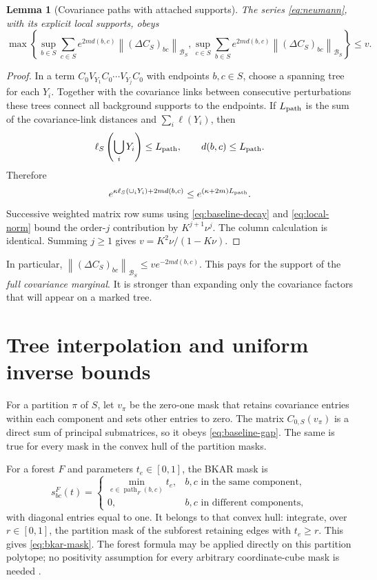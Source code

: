 \documentclass[11pt]{article}
\newtheorem{lemma}{Lemma}
\newcommand{\Bcal}{\mathcal B}
\newcommand{\norm}[1]{\left\|#1\right\|}
\begin{document}
\begin{lemma}[Covariance paths with attached supports]\label{lem:path}
The series \eqref{eq:neumann}, with its explicit local supports, obeys
\begin{equation}
 \max\left\{
 \sup_{b\in S}\sum_{c\in S}e^{2m d(b,c)}
                           \norm{(\Delta C_S)_{bc}}_{\Bcal_S},
 \sup_{c\in S}\sum_{b\in S}e^{2m d(b,c)}
                           \norm{(\Delta C_S)_{bc}}_{\Bcal_S}
 \right\}\le v.
 \label{eq:cov-supportbound}
\end{equation}
\end{lemma}

\begin{proof}
In a term
$C_0V_{Y_1}C_0\cdots V_{Y_j}C_0$ with endpoints $b,c\in S$,
choose a spanning tree for each $Y_i$. Together with the covariance
links between consecutive perturbations these trees connect all
background supports to the endpoints. If $L_{\rm path}$ is the sum
of the covariance-link distances and $\sum_i\ell(Y_i)$, then
\[
 \ell_S\left(\bigcup_iY_i\right)\le L_{\rm path},
 \qquad d(b,c)\le L_{\rm path}.
\]
Therefore
\[
 e^{\kappa\ell_S(\cup_iY_i)+2m d(b,c)}
          \le e^{(\kappa+2m)L_{\rm path}}.
\]
Successive weighted matrix row sums using
\eqref{eq:baseline-decay} and \eqref{eq:local-norm} bound the order-$j$
contribution by $K^{j+1}\nu^j$.
The column calculation is identical. Summing $j\ge1$ gives
$v=K^2\nu/(1-K\nu)$.
\end{proof}

In particular,
$\norm{(\Delta C_S)_{bc}}_{\Bcal_S}\le v e^{-2m d(b,c)}$.
This pays for the support of the \emph{full covariance marginal}.
It is stronger than expanding only the covariance factors that will
appear on a marked tree.

\section{Tree interpolation and uniform inverse bounds}

For a partition $\pi$ of $S$, let $v_\pi$ be the zero-one mask that
retains covariance entries within each component and sets other entries
to zero. The matrix $C_{0,S}(v_\pi)$ is a direct sum of principal
submatrices, so it obeys \eqref{eq:baseline-gap}.
The same is true for every mask in the convex hull of the partition
masks.

For a forest $F$ and parameters $t_e\in[0,1]$, the BKAR mask is
\begin{equation}
 s^F_{bc}(t)=
 \begin{cases}
 \min_{e\in\operatorname{path}_F(b,c)}t_e,
                 &b,c\text{ in the same component},\\
 0,              &b,c\text{ in different components},
 \end{cases}
 \label{eq:bkar-mask}
\end{equation}
with diagonal entries equal to one. It belongs to that convex hull:
integrate, over $r\in[0,1]$, the partition mask of the subforest
retaining edges with $t_e\ge r$. This gives \eqref{eq:bkar-mask}.
The forest formula may be applied directly on this partition polytope;
no positivity assumption for every arbitrary coordinate-cube mask
is needed \cite{AR,BKARnotes}.
\end{document}
